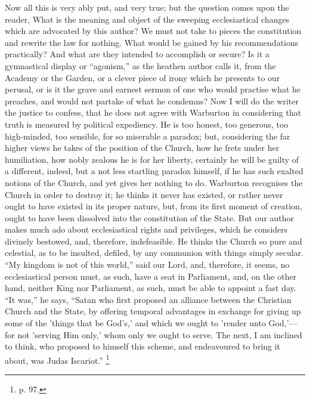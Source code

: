 Now all this is very ably put, and very true; but the question
comes upon the reader, What is the meaning and object of the sweeping
ecclesiastical changes which are advocated by this author? We must not
take to pieces the constitution and rewrite the law for nothing. What
would be gained by his recommendations practically? And what are they
intended to accomplish or secure? Is it a gymnastical display or
``agonism,'' as the heathen author calls it, from the Academy
or the Garden, or a clever piece of irony which he presents to our
perusal, or is it the grave and earnest sermon of one who would
practise what he preaches, and would not partake of what he condemns?
Now I will do the writer the justice to confess, that he does not
agree with Warburton in considering that truth is measured by
political expediency. He is too honest, too generous, too high-minded,
too sensible, for so miserable a paradox; but, considering the far
higher views he takes of the position of the Church, how he frets
under her humiliation, how nobly zealous he is for her liberty,
certainly he will be guilty of a different, indeed, but a not less
startling paradox himself, if he has such exalted notions of the
Church, and yet gives her nothing to do. Warburton recognises the
Church in order to destroy it; he thinks it never has existed, or
rather never ought to have existed in its proper nature, but, from its
first moment of creation, ought to have been dissolved into the
constitution of the State. But our author makes much ado about
ecclesiastical rights and privileges, which he considers divinely
bestowed, and, therefore, indefeasible. He thinks the Church so pure
and celestial, as to be insulted, defiled, by any communion with
things simply secular. ``My kingdom is not of this world,''
said our Lord, and, therefore, it seems, no ecclesiastical person
must, as such, have a seat in Parliament, and, on the other hand,
neither King nor Parliament, as such, must be able to appoint a fast
day. ``It was,'' he says, ``Satan who first proposed an
alliance between the Christian Church and the State, by offering
temporal advantages in exchange for giving up some of the 'things that
be God's,' and which we ought to 'render unto God,'—for not 'serving
Him only,' whom only we ought to serve. The next, I am inclined to
think, who proposed to himself this scheme, and endeavoured to bring
it about, was Judas Iscariot.'' \footnote{p. 97.}

